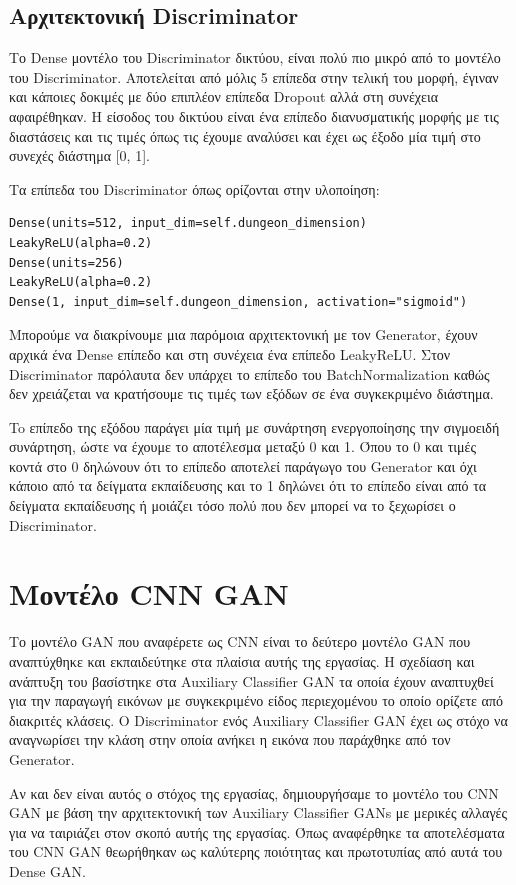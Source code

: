 \subsection{Αρχιτεκτονική Discriminator}
Το Dense μοντέλο του Discriminator δικτύου, είναι πολύ πιο μικρό από το μοντέλο του Discriminator. Αποτελείται από μόλις 5 επίπεδα στην τελική του μορφή, έγιναν και κάποιες δοκιμές με δύο επιπλέον επίπεδα Dropout αλλά στη συνέχεια αφαιρέθηκαν. Η είσοδος του δικτύου είναι ένα επίπεδο διανυσματικής μορφής με τις διαστάσεις και τις τιμές όπως τις έχουμε αναλύσει και έχει ως έξοδο μία τιμή στο συνεχές διάστημα [0, 1].
\par
Τα επίπεδα του Discriminator όπως ορίζονται στην υλοποίηση:
\begin{verbatim}
Dense(units=512, input_dim=self.dungeon_dimension)
LeakyReLU(alpha=0.2)
Dense(units=256)
LeakyReLU(alpha=0.2)
Dense(1, input_dim=self.dungeon_dimension, activation="sigmoid")
\end{verbatim}
\par
Μπορούμε να διακρίνουμε μια παρόμοια αρχιτεκτονική με τον Generator, έχουν αρχικά ένα Dense επίπεδο και στη συνέχεια ένα επίπεδο LeakyReLU. Στον Discriminator παρόλαυτα δεν υπάρχει το επίπεδο του BatchNormalization καθώς δεν χρειάζεται να κρατήσουμε τις τιμές των εξόδων σε ένα συγκεκριμένο διάστημα.
\par
To επίπεδο της εξόδου παράγει μία τιμή με συνάρτηση ενεργοποίησης την σιγμοειδή συνάρτηση, ώστε να έχουμε το αποτέλεσμα μεταξύ 0 και 1. Όπου το 0 και τιμές κοντά στο 0 δηλώνουν ότι το επίπεδο αποτελεί παράγωγο του Generator και όχι κάποιο από τα δείγματα εκπαίδευσης και το 1 δηλώνει ότι το επίπεδο είναι από τα δείγματα εκπαίδευσης ή μοιάζει τόσο πολύ που δεν μπορεί να το ξεχωρίσει ο Discriminator.

\section{Μοντέλο CNN GAN}

Το μοντέλο GAN που αναφέρετε ως CNN είναι το δεύτερο μοντέλο GAN που αναπτύχθηκε και εκπαιδεύτηκε στα πλαίσια αυτής της εργασίας. Η σχεδίαση και ανάπτυξη του βασίστηκε στα Auxiliary Classifier GAN \cite{auxgan} τα οποία έχουν αναπτυχθεί για την παραγωγή εικόνων με συγκεκριμένο είδος περιεχομένου το οποίο ορίζετε από διακριτές κλάσεις. Ο Discriminator ενός Auxiliary Classifier GAN έχει ως στόχο να αναγνωρίσει την κλάση στην οποία ανήκει η εικόνα που παράχθηκε από τον Generator. 
\par
Αν και δεν είναι αυτός ο στόχος της εργασίας, δημιουργήσαμε το μοντέλο του CNN GAN με βάση την αρχιτεκτονική των Auxiliary Classifier GANs με μερικές αλλαγές για να ταιριάζει στον σκοπό αυτής της εργασίας. Όπως αναφέρθηκε τα αποτελέσματα του CNN GAN θεωρήθηκαν ως καλύτερης ποιότητας και πρωτοτυπίας από αυτά του  Dense GAN.

